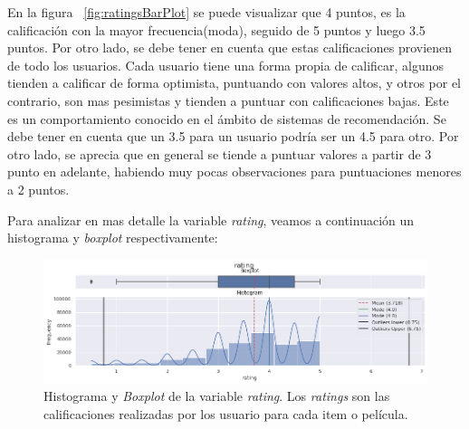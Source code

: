 \documentclass[11pt,a4paper,twoside]{thesis}
\begin{document}
En la figura ~\ref{fig:ratingsBarPlot} se puede visualizar que 4 puntos, es la calificación con la mayor frecuencia(moda), seguido de 5 puntos y luego 3.5 puntos. Por otro lado, se debe tener en cuenta que estas calificaciones provienen de todo los usuarios. Cada usuario tiene una forma propia de calificar, algunos tienden a calificar de forma optimista, puntuando con valores altos, y otros por el contrario, son mas pesimistas y tienden a puntuar con calificaciones bajas. Este es un comportamiento conocido en el ámbito de sistemas de recomendación. Se debe tener en cuenta que un 3.5 para un usuario podría ser un 4.5 para otro. Por otro lado, se aprecia que en general se tiende a puntuar valores a partir de 3 punto en adelante, habiendo muy pocas observaciones para puntuaciones menores a 2 puntos.

\clearpage

Para analizar en mas detalle la variable \textit{rating}, veamos a continuación un histograma y \textit{boxplot} respectivamente:

\begin{center}
\end{center}

\begin{figure}[h!]
	\centering
	\includegraphics[width=15cm]{./images/rating-boxplot-histplot.png}
	\caption{Histograma y \textit{Boxplot} de la variable \textit{rating}. Los \textit{ratings} son las calificaciones realizadas por los usuario para cada item o película.}
	\label{fig:ratingsHistPlot}
\end{figure}
\end{document}
